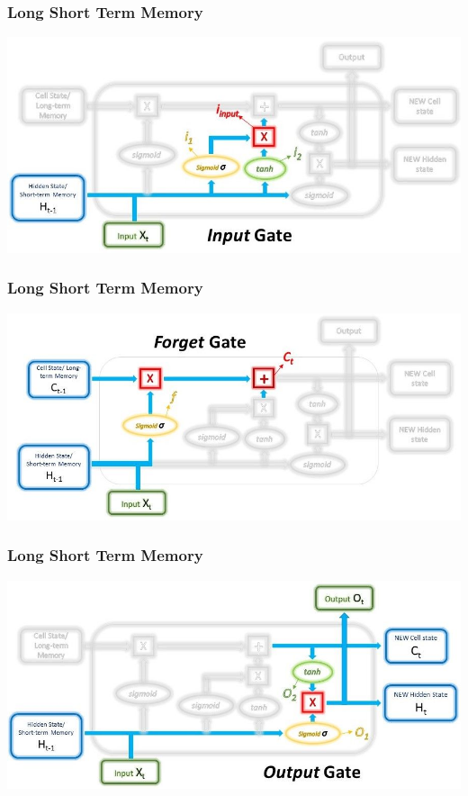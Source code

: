 \documentclass{beamer}
\begin{document}
 \begin{frame}
 \frametitle{Long Short Term Memory}
 \includegraphics[width=\textwidth]{InputGate.JPG}
 \end{frame}

 \begin{frame}
 \frametitle{Long Short Term Memory}
 \includegraphics[width=\textwidth]{ForgetGate.JPG}
 \end{frame}

 \begin{frame}
 \frametitle{Long Short Term Memory}
 \includegraphics[width=\textwidth]{OutputGate.JPG}
 \end{frame}
\end{document}
